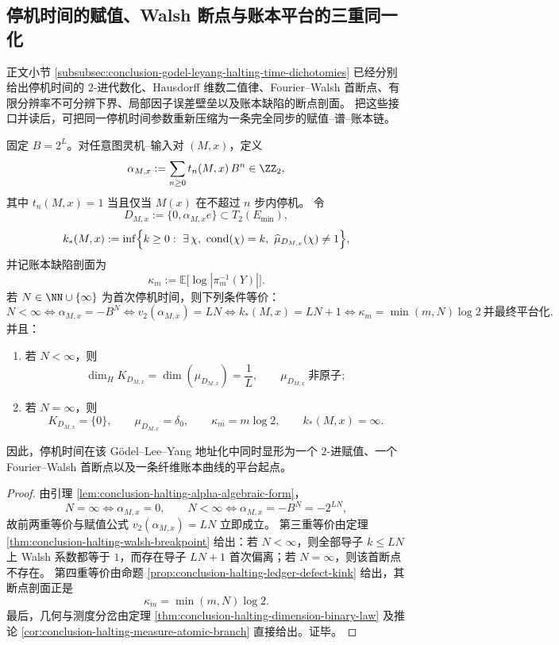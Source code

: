 \subsection{停机时间的赋值、Walsh 断点与账本平台的三重同一化}

正文小节 \ref{subsubsec:conclusion-godel-leyang-halting-time-dichotomies}
已经分别给出停机时间的 \(2\)-进代数化、Hausdorff 维数二值律、Fourier--Walsh 首断点、有限分辨率不可分辨下界、局部因子误差壁垒以及账本缺陷的断点剖面。
把这些接口并读后，可把同一停机时间参数重新压缩为一条完全同步的赋值--谱--账本链。

\begin{theorem}\label{thm:derived-halting-valuation-walsh-ledger-unification}
固定 \(B=2^L\)。对任意图灵机--输入对 \((M,x)\)，定义
\[
\alpha_{M,x}:=\sum_{n\ge 0}t_n(M,x)\,B^n\in\ZZ_2,
\]
其中 \(t_n(M,x)=1\) 当且仅当 \(M(x)\) 在不超过 \(n\) 步内停机。
令
\[
D_{M,x}:=\{0,\alpha_{M,x}e\}\subset T_2(E_{\min}),
\]
\[
k_\ast(M,x):=
\inf\Bigl\{
k\ge 0:\ \exists\,\chi,\ \mathrm{cond}(\chi)=k,\
\widehat{\mu}_{D_{M,x}}(\chi)\neq 1
\Bigr\},
\]
并记账本缺陷剖面为
\[
\kappa_m:=\mathbb E\bigl[\log|\pi_m^{-1}(Y)|\bigr].
\]
若 \(N\in\NN\cup\{\infty\}\) 为首次停机时间，则下列条件等价：
\[
N<\infty
\Longleftrightarrow
\alpha_{M,x}=-B^N
\Longleftrightarrow
v_2(\alpha_{M,x})=LN
\Longleftrightarrow
k_\ast(M,x)=LN+1
\Longleftrightarrow
\kappa_m=\min(m,N)\log 2\ \text{并最终平台化}.
\]
并且：
\begin{enumerate}
\normalfont
  \item 若 \(N<\infty\)，则
  \[
  \dim_H K_{D_{M,x}}=\dim(\mu_{D_{M,x}})=\frac{1}{L},
  \qquad
  \mu_{D_{M,x}}\ \text{非原子};
  \]
  \item 若 \(N=\infty\)，则
  \[
  K_{D_{M,x}}=\{0\},
  \qquad
  \mu_{D_{M,x}}=\delta_0,
  \qquad
  \kappa_m=m\log 2,
  \qquad
  k_\ast(M,x)=\infty.
  \]
\end{enumerate}
因此，停机时间在该 Gödel--Lee--Yang 地址化中同时显形为一个 \(2\)-进赋值、一个 Fourier--Walsh 首断点以及一条纤维账本曲线的平台起点。
\end{theorem}

\begin{proof}
由引理 \ref{lem:conclusion-halting-alpha-algebraic-form}，
\[
N=\infty \iff \alpha_{M,x}=0,
\qquad
N<\infty \iff \alpha_{M,x}=-B^N=-2^{LN},
\]
故前两重等价与赋值公式
\(
v_2(\alpha_{M,x})=LN
\)
立即成立。
第三重等价由定理 \ref{thm:conclusion-halting-walsh-breakpoint} 给出：若 \(N<\infty\)，则全部导子 \(k\le LN\) 上 Walsh 系数都等于 \(1\)，而存在导子 \(LN+1\) 首次偏离；若 \(N=\infty\)，则该首断点不存在。
第四重等价由命题 \ref{prop:conclusion-halting-ledger-defect-kink} 给出，其断点剖面正是
\[
\kappa_m=\min(m,N)\log 2.
\]
最后，几何与测度分岔由定理 \ref{thm:conclusion-halting-dimension-binary-law}
及推论 \ref{cor:conclusion-halting-measure-atomic-branch} 直接给出。证毕。
\end{proof}

